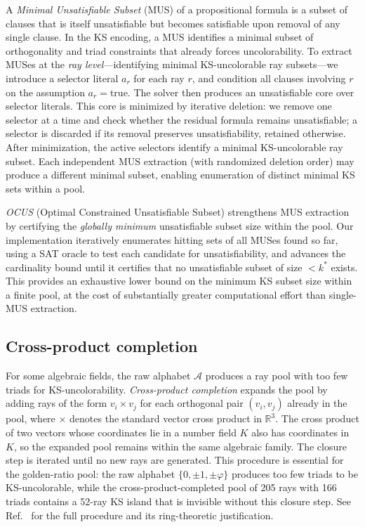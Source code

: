 \documentclass[twocolumn,pra,superscriptaddress,nofootinbib]{revtex4-2}
\newcommand{\R}{\mathbb{R}}
\begin{document}
A \emph{Minimal Unsatisfiable Subset} (MUS) of a propositional formula is a subset of
clauses that is itself unsatisfiable but becomes satisfiable upon removal of any single
clause. In the KS encoding, a MUS identifies a minimal subset of orthogonality and
triad constraints that already forces uncolorability. To extract MUSes at the
\emph{ray level}---identifying minimal KS-uncolorable ray subsets---we introduce a
selector literal $a_r$ for each ray $r$, and condition all clauses involving $r$ on
the assumption $a_r = \mathrm{true}$. The solver then produces an unsatisfiable core
over selector literals. This core is minimized by iterative deletion: we remove one
selector at a time and check whether the residual formula remains unsatisfiable; a
selector is discarded if its removal preserves unsatisfiability, retained otherwise.
After minimization, the active selectors identify a minimal KS-uncolorable ray subset.
Each independent MUS extraction (with randomized deletion order) may produce a
different minimal subset, enabling enumeration of distinct minimal KS sets within a
pool.

\emph{OCUS} (Optimal Constrained Unsatisfiable Subset) strengthens MUS extraction by
certifying the \emph{globally minimum} unsatisfiable subset size within the pool.
Our implementation iteratively enumerates hitting sets of all MUSes found so far,
using a SAT oracle to test each candidate for unsatisfiability, and advances the
cardinality bound until it certifies that no unsatisfiable subset of size $< k^*$
exists. This provides an exhaustive lower bound on the minimum
KS subset size within a finite pool, at the cost of substantially greater computational
effort than single-MUS extraction.

\subsection{Cross-product completion}

For some algebraic fields, the raw alphabet $\mathcal{A}$ produces a ray pool with too
few triads for KS-uncolorability. \emph{Cross-product completion} expands the pool by
adding rays of the form $v_i \times v_j$ for each orthogonal pair $(v_i, v_j)$ already
in the pool, where $\times$ denotes the standard vector cross product in $\R^3$. The
cross product of two vectors whose coordinates lie in a number field $K$ also has
coordinates in $K$, so the expanded pool remains within the same algebraic family. The
closure step is iterated until no new rays are generated. This procedure is essential
for the golden-ratio pool: the raw alphabet $\{0, \pm 1, \pm \varphi\}$ produces too
few triads to be KS-uncolorable, while the cross-product-completed pool of 205 rays
with 166 triads contains a 52-ray KS island that is invisible without this closure step.
See Ref.~\cite{Kernaghan2026algebraic} for the full procedure and its ring-theoretic
justification.
\end{document}
